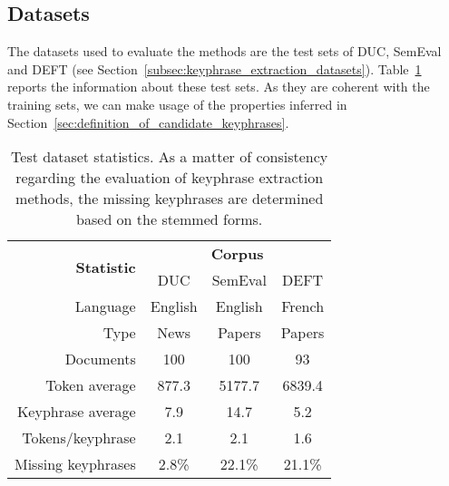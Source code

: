   \subsection{Datasets}
  \label{subsec:datasets}
    The datasets used to evaluate the methods are the test sets of DUC,
    SemEval and DEFT (see Section~\ref{subsec:keyphrase_extraction_datasets}).
    Table~\ref{tab:test_dataset_statistics} reports the information about these
    test sets. As they are coherent with the training sets, we can make usage of
    the properties inferred in
    Section~\ref{sec:definition_of_candidate_keyphrases}.
    \begin{table}
      \centering
      \begin{tabular}{@{~}r@{~}c@{~}c@{~}c@{~}}
        \toprule
        \multirow{2}{*}[-2pt]{\textbf{Statistic}} & \multicolumn{3}{c}{\textbf{Corpus}}\\
        \cmidrule{2-4}
        & DUC & SemEval & DEFT\\
        \midrule
        Language & English & English & French\\
        Type & News & Papers & Papers\\
        Documents & 100 & 100 & 93\\
        Token average & 877.3 & 5177.7 & 6839.4\\
        Keyphrase average & 7.9 & 14.7 & 5.2\\
        Tokens/keyphrase & 2.1 & 2.1 & 1.6\\
        Missing keyphrases & 2.8\% & 22.1\% & 21.1\% \\
        \bottomrule
      \end{tabular}
      \caption{Test dataset statistics. As a matter of consistency regarding
               the evaluation of keyphrase extraction methods, the missing
               keyphrases are determined based on the stemmed forms.
               \label{tab:test_dataset_statistics}}
    \end{table}

